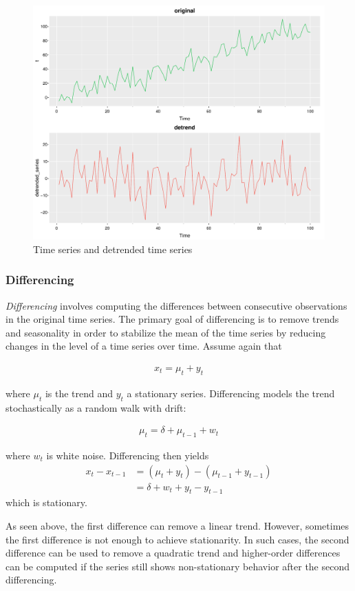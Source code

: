 \begin{figure}
\centering
\includegraphics[width=.75\textwidth]{figure39a.pdf}
\caption{Time series and detrended time series}
\label{fig:figure39a}
\end{figure}

\subsubsection*{Differencing}

\emph{Differencing} involves computing the differences between consecutive observations in the original time series. The primary goal of differencing is to remove trends and seasonality in order to stabilize the mean of the time series by reducing changes in the level of a time series over time. Assume again that 

\begin{align*}x_t = \mu_t + y_t\end{align*}

\noindent where $\mu_t$ is the trend and $y_t$ a stationary series. Differencing models the trend stochastically as a random walk with drift: 

\begin{align*}\mu_t = \delta + \mu_{t-1} + w_t\end{align*}

\noindent where $w_t$ is white noise. Differencing then yields 
\begin{align*}
x_t - x_{t-1} &= (\mu_t + y_t) - (\mu_{t-1} + y_{t-1}) \\
 &= \delta + w_t + y_t - y_{t-1}
 \end{align*}
\noindent which is stationary.

As seen above, the first difference can remove a linear trend. However, sometimes the first difference is not enough to achieve stationarity. In such cases, the second difference can be used to remove a quadratic trend and higher-order differences can be computed if the series still shows non-stationary behavior after the second differencing.

